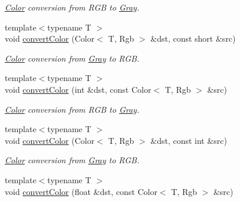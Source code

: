 \begin{DoxyCompactItemize}
\begin{DoxyCompactList}\small\item\em \hyperlink{class_d_o_1_1_color}{Color} conversion from R\-G\-B to \hyperlink{struct_d_o_1_1_gray}{Gray}. \end{DoxyCompactList}\item 
\hypertarget{group___color_conversion_ga03d8f2fa5babb6e94d68322054c63f74}{{\footnotesize template$<$typename T $>$ }\\void \hyperlink{group___color_conversion_ga03d8f2fa5babb6e94d68322054c63f74}{convert\-Color} (Color$<$ T, Rgb $>$ \&dst, const short \&src)}\label{group___color_conversion_ga03d8f2fa5babb6e94d68322054c63f74}

\begin{DoxyCompactList}\small\item\em \hyperlink{class_d_o_1_1_color}{Color} conversion from \hyperlink{struct_d_o_1_1_gray}{Gray} to R\-G\-B. \end{DoxyCompactList}\item 
\hypertarget{group___color_conversion_ga503b181247cf148267c36db74329c655}{{\footnotesize template$<$typename T $>$ }\\void \hyperlink{group___color_conversion_ga503b181247cf148267c36db74329c655}{convert\-Color} (int \&dst, const Color$<$ T, Rgb $>$ \&src)}\label{group___color_conversion_ga503b181247cf148267c36db74329c655}

\begin{DoxyCompactList}\small\item\em \hyperlink{class_d_o_1_1_color}{Color} conversion from R\-G\-B to \hyperlink{struct_d_o_1_1_gray}{Gray}. \end{DoxyCompactList}\item 
\hypertarget{group___color_conversion_gab85cc40825c116643b2bfe8ed890e2b5}{{\footnotesize template$<$typename T $>$ }\\void \hyperlink{group___color_conversion_gab85cc40825c116643b2bfe8ed890e2b5}{convert\-Color} (Color$<$ T, Rgb $>$ \&dst, const int \&src)}\label{group___color_conversion_gab85cc40825c116643b2bfe8ed890e2b5}

\begin{DoxyCompactList}\small\item\em \hyperlink{class_d_o_1_1_color}{Color} conversion from \hyperlink{struct_d_o_1_1_gray}{Gray} to R\-G\-B. \end{DoxyCompactList}\item 
\hypertarget{group___color_conversion_ga63067bbe79b68f1aca280be0751d9245}{{\footnotesize template$<$typename T $>$ }\\void \hyperlink{group___color_conversion_ga63067bbe79b68f1aca280be0751d9245}{convert\-Color} (float \&dst, const Color$<$ T, Rgb $>$ \&src)}\label{group___color_conversion_ga63067bbe79b68f1aca280be0751d9245}


\end{DoxyCompactItemize}
